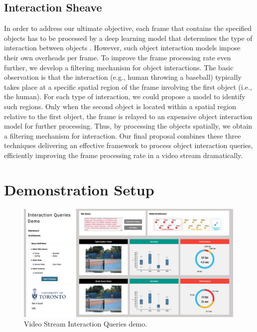 \documentclass[sigconf]{acmart}
\begin{document}
\subsection{Interaction Sheave}
\label{sec:sheave}

In order to address our ultimate objective, each frame that contains the specified objects has to be processed by a deep learning model that determines the type of interaction between objects \cite{gkioxari2018detecting, kolesnikov2019detecting, ma2017grounded, ulutan2018actor}. 
However, such object interaction models impose their own overheads per frame. To improve the frame processing rate even further, we develop a filtering mechanism for object interactions. The basic observation is that the interaction (e.g., human throwing a baseball) typically takes place at a specific spatial region of the frame involving the first object (i.e., the human). For each type of interaction, we could propose a model to identify such regions. Only when the second object is located within a spatial region relative to the first object, the frame is relayed to an expensive object interaction model for further processing. Thus, by processing the objects spatially, we obtain a filtering mechanism for interaction. 
Our final proposal combines these three techniques delivering an effective framework to process object interaction queries, efficiently improving the frame processing rate in a video stream dramatically.


\section{Demonstration Setup}
\label{sec:demonstration}

\begin{figure}[h]
\centering
\includegraphics[width=0.99\textwidth]{graphs/demo.png}
\caption{Video Stream Interaction Queries demo.}
\label{fig:frontend}
\end{figure}
\end{document}

